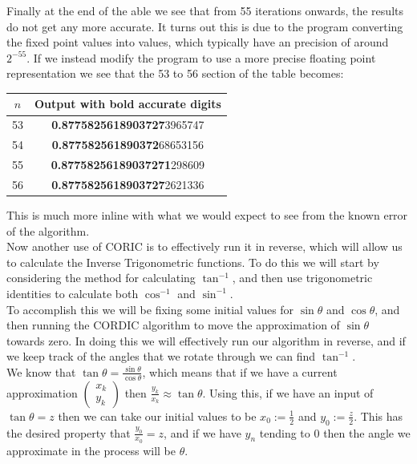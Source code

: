 {Finally at the end of the able we see that from 55 iterations onwards, the results do not get any more accurate. It turns out this is due to the program converting the  fixed point values into  values, which typically have an precision of around \(2^{-55}\). If we instead modify the program to use a more precise floating point representation we see that the 53 to 56 section of the table becomes:

{\selectfont
\begin{center}
\begin{tabular}{|c|c|}
	\hline
	\(n\) & \textsf{Output with bold accurate digits}\\\hline
	53 & \textbf{0.8775825618903727}3965747\\\hline
	54 & \textbf{0.877582561890372}68653156\\\hline
	55 & \textbf{0.87758256189037271}298609\\\hline
	56 & \textbf{0.8775825618903727}2621336\\\hline
\end{tabular}
\end{center}}

This is much more inline with what we would expect to see from the known error of the algorithm.\\

Now another use of CORIC is to effectively run it in reverse, which will allow us to calculate the Inverse Trigonometric functions. To do this we will start by considering the method for calculating \(\tan^{-1}\), and then use trigonometric identities to calculate both \(\cos^{-1}\) and \(\sin^{-1}\).\\

To accomplish this we will be fixing some initial values for \(\sin\theta\) and \(\cos\theta\), and then running the CORDIC algorithm to move the approximation of \(\sin\theta\) towards zero. In doing this we will effectively run our algorithm in reverse, and if we keep track of the angles that we rotate through we can find \(\tan^{-1}\).\\

We know that \(\tan\theta = \frac{\sin\theta}{\cos\theta}\), which means that if we have a current approximation \(\left(\begin{array}{c}x_k\\y_k\end{array}\right)\) then \(\frac{y_k}{x_k} \approx \tan\theta\). Using this, if we have an input of \(\tan\theta = z\) then we can take our initial values to be \(x_0 := \tfrac{1}{2}\) and \(y_0 := \tfrac{z}{2}\). This has the desired property that \(\tfrac{y_0}{x_0} = z\), and if we have \(y_n\) tending to 0 then the angle we approximate in the process will be \(\theta\). \\

}
